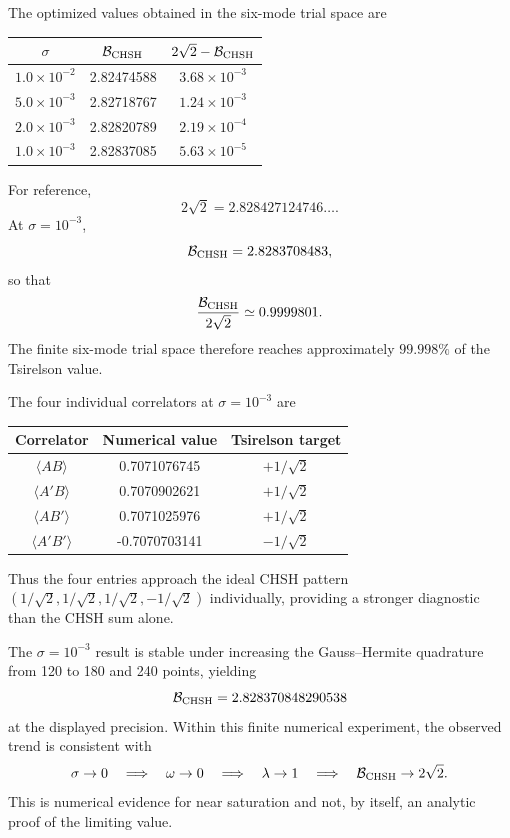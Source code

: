 \documentclass[11pt]{article}
\begin{document}
The optimized values obtained in the six-mode trial space are
\begin{center}
\begin{tabular}{ccc}
\toprule
$\sigma$ & $\mathcal B_{\rm CHSH}$ & $2\sqrt2-\mathcal B_{\rm CHSH}$\\
\midrule
$1.0\times10^{-2}$ & 2.82474588 & $3.68\times10^{-3}$\\
$5.0\times10^{-3}$ & 2.82718767 & $1.24\times10^{-3}$\\
$2.0\times10^{-3}$ & 2.82820789 & $2.19\times10^{-4}$\\
$1.0\times10^{-3}$ & 2.82837085 & $5.63\times10^{-5}$\\
\bottomrule
\end{tabular}
\end{center}
For reference,
\begin{equation}
 2\sqrt2=2.828427124746\ldots .
\end{equation}
At $\sigma=10^{-3}$,
\begin{equation}
 \mathcal B_{\rm CHSH}=2.8283708483,
\end{equation}
so that
\begin{equation}
 \frac{\mathcal B_{\rm CHSH}}{2\sqrt2}\simeq0.9999801.
\end{equation}
The finite six-mode trial space therefore reaches approximately $99.998\%$ of the Tsirelson value.

The four individual correlators at $\sigma=10^{-3}$ are
\begin{center}
\begin{tabular}{ccc}
\toprule
Correlator & Numerical value & Tsirelson target\\
\midrule
$\langle AB\rangle$   & 0.7071076745  & $+1/\sqrt2$\\
$\langle A'B\rangle$  & 0.7070902621  & $+1/\sqrt2$\\
$\langle AB'\rangle$  & 0.7071025976  & $+1/\sqrt2$\\
$\langle A'B'\rangle$ & -0.7070703141 & $-1/\sqrt2$\\
\bottomrule
\end{tabular}
\end{center}
Thus the four entries approach the ideal CHSH pattern
$(1/\sqrt2,1/\sqrt2,1/\sqrt2,-1/\sqrt2)$ individually, providing a stronger diagnostic than the CHSH sum alone.

The $\sigma=10^{-3}$ result is stable under increasing the Gauss--Hermite quadrature from 120 to 180 and 240 points, yielding
\begin{equation}
 \mathcal B_{\rm CHSH}=2.828370848290538
\end{equation}
at the displayed precision. Within this finite numerical experiment, the observed trend is consistent with
\begin{equation}
 \sigma\to0
 \quad\Longrightarrow\quad
 \omega\to0
 \quad\Longrightarrow\quad
 \lambda\to1
 \quad\Longrightarrow\quad
 \mathcal B_{\rm CHSH}\to2\sqrt2.
 \label{eq:trend}
\end{equation}
This is numerical evidence for near saturation and not, by itself, an analytic proof of the limiting value.
\end{document}
